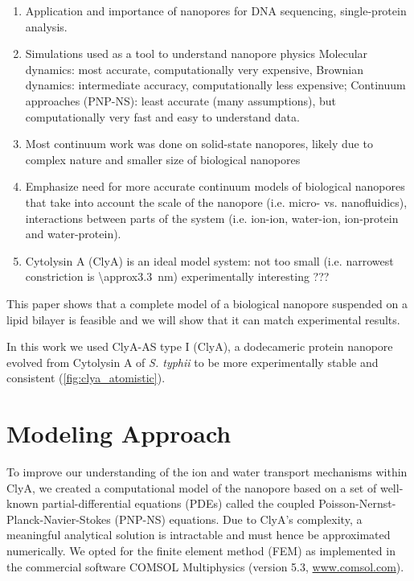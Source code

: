 \documentclass[journal=ancac3, manuscript=article, etalmode=truncate,maxauthors=0]{achemso}
\begin{document}
\begin{enumerate}
	\item Application and importance of nanopores for DNA sequencing, single-protein analysis. 
	\item Simulations used as a tool to understand nanopore physics
	\subitem Molecular dynamics: most accurate, computationally very expensive,
	\subitem Brownian dynamics: intermediate accuracy, computationally less expensive;
	\subitem Continuum approaches (PNP-NS): least accurate (many assumptions), but computationally very fast and easy to understand data.
	\item Most continuum work was done on solid-state nanopores, likely due to complex nature and smaller size of biological nanopores
	\item Emphasize need for more accurate continuum models of biological nanopores that take into account
	\subitem the scale of the nanopore (i.e. micro- vs. nanofluidics),
	\subitem interactions between parts of the system (i.e. ion-ion, water-ion, ion-protein and water-protein).
	\item Cytolysin A (ClyA) is an ideal model system:
	\subitem not too small (i.e. narrowest constriction is \SI{\approx3.3}{\nano\meter})
	\subitem experimentally interesting
	\subitem ???
\end{enumerate}

This paper shows that a complete model of a biological nanopore suspended on a lipid bilayer is feasible and we will show that it can match experimental results.

In this work we used ClyA-AS type I (ClyA), a dodecameric protein nanopore evolved from Cytolysin A of \textit{S. typhii} to be more experimentally stable and consistent (\cref{fig:clya_atomistic}).\cite{soskine2013}

\section{Modeling Approach}\label{sect:modeling_approach}
To improve our understanding of the ion and water transport mechanisms within ClyA, we created a 
computational model of the nanopore based on a set of well-known partial-differential equations (PDEs) called 
the coupled Poisson-Nernst-Planck-Navier-Stokes (PNP-NS) equations. Due to ClyA's complexity, a meaningful 
analytical solution is intractable and must hence be approximated numerically. We opted for the finite 
element method (FEM) as implemented in the commercial software COMSOL Multiphysics (version 5.3, 
\href{www.comsol.com}{www.comsol.com}).
\end{document}
